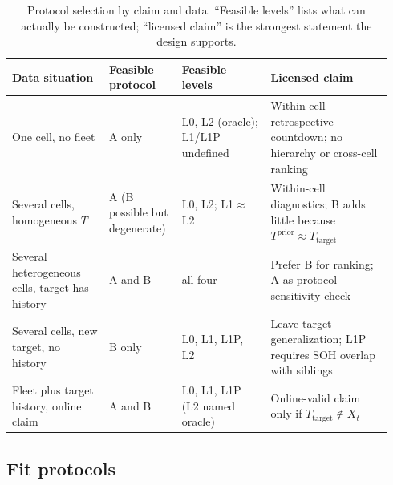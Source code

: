 \documentclass[preprint,12pt]{elsarticle}
\begin{document}
\begin{table}[htbp]
\centering
\footnotesize
\caption{Protocol selection by claim and data. “Feasible levels” lists what can actually be constructed; “licensed claim” is the strongest statement the design supports.}
\label{tab:decision}
\setlength{\tabcolsep}{2.5pt}
\begin{tabular}{@{}>{\raggedright\arraybackslash}p{0.24\linewidth}>{\raggedright\arraybackslash}p{0.18\linewidth}>{\raggedright\arraybackslash}p{0.22\linewidth}>{\raggedright\arraybackslash}p{0.30\linewidth}@{}}
\toprule
Data situation & Feasible protocol & Feasible levels & Licensed claim \\
\midrule
One cell, no fleet & A only & L0, L2 (oracle); L1/L1P undefined & Within-cell retrospective countdown; no hierarchy or cross-cell ranking \\
Several cells, homogeneous $T$ & A (B possible but degenerate) & L0, L2; L1$\approx$L2 & Within-cell diagnostics; B adds little because $T^{\mathrm{prior}}\approx T_{\mathrm{target}}$ \\
Several heterogeneous cells, target has history & A and B & all four & Prefer B for ranking; A as protocol-sensitivity check \\
Several cells, new target, no history & B only & L0, L1, L1P, L2 & Leave-target generalization; L1P requires SOH overlap with siblings \\
Fleet plus target history, online claim & A and B & L0, L1, L1P (L2 named oracle) & Online-valid claim only if $T_{\mathrm{target}}\notin X_t$ \\
\bottomrule
\end{tabular}
\end{table}

\subsection{Fit protocols}
\label{sec:fit}
\end{document}

